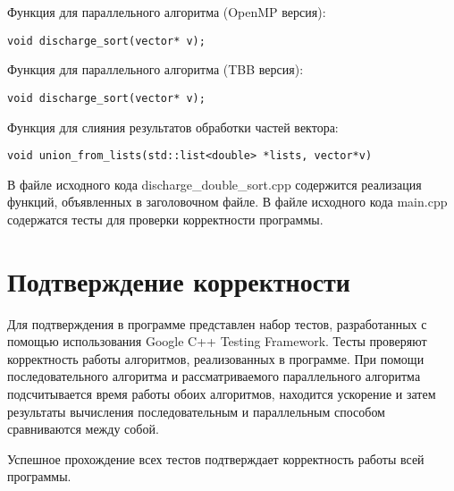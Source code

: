 \documentclass{report}
\begin{document}
\par Функция для параллельного алгоритма (OpenMP версия):
\begin{lstlisting}
void discharge_sort(vector* v);
\end{lstlisting}
\par Функция для параллельного алгоритма (TBB версия):
\begin{lstlisting}
void discharge_sort(vector* v);
\end{lstlisting}
\par Функция для слияния результатов обработки частей вектора:
\begin{lstlisting}
void union_from_lists(std::list<double> *lists, vector*v)
\end{lstlisting}

\par В файле исходного кода discharge\_double\_sort.cpp содержится реализация функций, объявленных в заголовочном файле. В файле исходного кода main.cpp содержатся тесты для проверки корректности программы.
\newpage

\section*{Подтверждение корректности}
Для подтверждения в программе представлен набор тестов, разработанных с помощью использования Google C++ Testing Framework. Тесты проверяют корректность работы алгоритмов, реализованных в программе. При помощи последовательного алгоритма и рассматриваемого параллельного алгоритма подсчитывается время работы обоих алгоритмов, находится ускорение и затем результаты вычисления  последовательным и параллельным способом сравниваются между собой.
\par Успешное прохождение всех тестов подтверждает корректность работы всей программы.
\newpage

\end{document}
